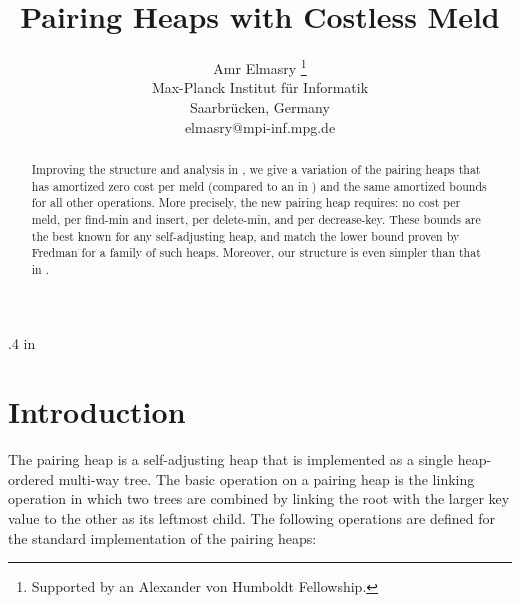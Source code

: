 
\oddsidemargin .4 in       
\setlength{\textheight}{8in}
\setlength{\textwidth}{5.4in}


\newcommand{\hide}[1]{}
\newcommand{\sequence}[1]{\left\langle#1\right\rangle}

\newtheorem{theorem}{Theorem}
\newtheorem{lemma}{Lemma}
\newtheorem{prop}{Proposition}



\title{\Large Pairing Heaps with Costless Meld}

\author{Amr Elmasry \thanks{Supported by an Alexander von Humboldt Fellowship.}\\
Max-Planck Institut f\"{u}r Informatik \\
Saarbr\"{u}cken, Germany \\
\small elmasry@mpi-inf.mpg.de}
\date{}

\maketitle

\begin{abstract} \small\baselineskip=9pt
Improving the structure and analysis in \cite{elm0}, we give a variation of the pairing heaps that has amortized zero cost per meld (compared to an  in \cite{elm0}) and the same amortized bounds for all other operations. 
More precisely, the new pairing heap requires: no cost per meld,  per find-min and insert,  per delete-min, and  per decrease-key. These bounds are the best known for any self-adjusting heap, and match the lower bound proven by Fredman for a family of such heaps. Moreover, our structure is even simpler than that in \cite{elm0}.
 
\end{abstract}


\section{Introduction}

The pairing heap \cite{fsst} is a self-adjusting heap that is implemented as a single heap-ordered multi-way tree. The basic operation on a pairing heap is the linking
operation in which two trees are combined by linking the root with
the larger key value to the other as its leftmost child. 
The following operations are defined for the standard implementation of the pairing heaps:

